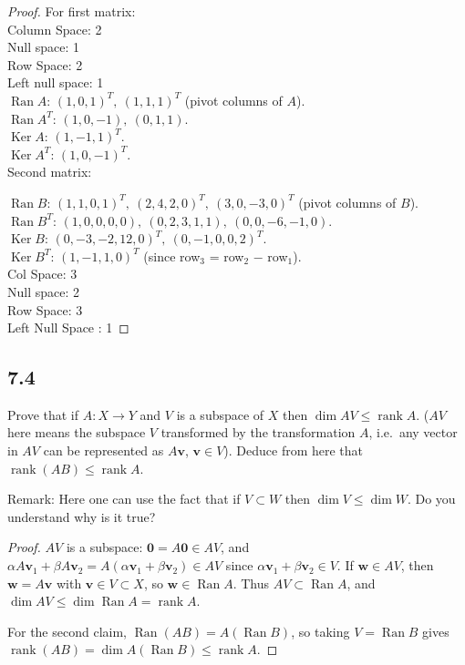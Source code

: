 \documentclass{amsart}
\begin{document}
\begin{proof}
    For first matrix: \\ 
    Column Space: 2 \\ 
    Null space: 1 \\ 
    Row Space: 2 \\ 
    Left null space: 1 \\ 
   $\operatorname{Ran}A$: $(1,0,1)^T,\ (1,1,1)^T$ (pivot columns of $A$).\\
   $\operatorname{Ran}A^T$: $(1,0,-1),\ (0,1,1)$.\\
   $\operatorname{Ker}A$: $(1,-1,1)^T$.\\
   $\operatorname{Ker}A^T$: $(1,0,-1)^T$. \\
Second matrix: 

   $\operatorname{Ran}B$: $(1,1,0,1)^T,\ (2,4,2,0)^T,\ (3,0,-3,0)^T$ (pivot columns of $B$).\\
   $\operatorname{Ran}B^T$: $(1,0,0,0,0),\ (0,2,3,1,1),\ (0,0,-6,-1,0)$.\\
   $\operatorname{Ker}B$: $(0,-3,-2,12,0)^T,\ (0,-1,0,0,2)^T$.\\
   $\operatorname{Ker}B^T$: $(1,-1,1,0)^T$ (since row$_3$ = row$_2$ $-$ row$_1$).\\

    Col Space: 3 \\ 
    Null space: 2 \\ 
    Row Space: 3 \\ 
    Left Null Space : 1
\end{proof}
\subsection*{7.4}
Prove that if $A : X \to Y$ and $V$ is a subspace of $X$ then $\dim AV \le \operatorname{rank} A$. ($AV$ here means the subspace $V$ transformed by the transformation $A$, i.e.\ any vector in $AV$ can be represented as $A\mathbf{v}$, $\mathbf{v} \in V$). Deduce from here that $\operatorname{rank}(AB) \le \operatorname{rank} A$.

Remark: Here one can use the fact that if $V \subset W$ then $\dim V \le \dim W$. Do you understand why is it true?

\begin{proof}
$AV$ is a subspace: $\mathbf{0} = A\mathbf{0} \in AV$, and $\alpha A\mathbf{v}_1 + \beta A\mathbf{v}_2 = A(\alpha\mathbf{v}_1 + \beta\mathbf{v}_2) \in AV$ since $\alpha\mathbf{v}_1+\beta\mathbf{v}_2 \in V$. If $\mathbf{w} \in AV$, then $\mathbf{w} = A\mathbf{v}$ with $\mathbf{v}\in V\subset X$, so $\mathbf{w}\in\operatorname{Ran}A$. Thus $AV \subset \operatorname{Ran}A$, and $\dim AV \le \dim\operatorname{Ran}A = \operatorname{rank}A$.

For the second claim, $\operatorname{Ran}(AB) = A(\operatorname{Ran}B)$, so taking $V = \operatorname{Ran}B$ gives $\operatorname{rank}(AB) = \dim A(\operatorname{Ran}B) \le \operatorname{rank}A$.
\end{proof}
\end{document}
